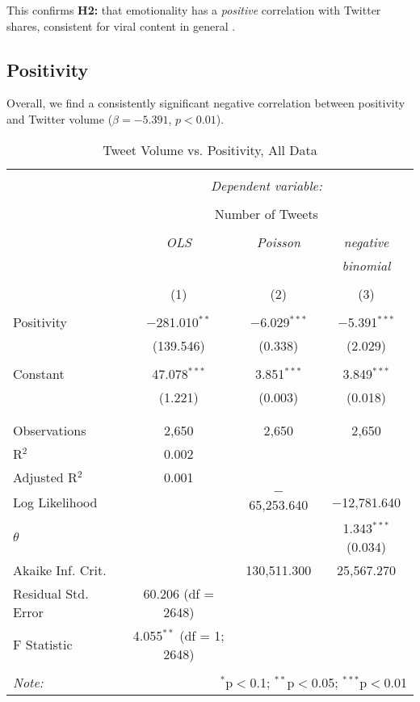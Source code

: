 This confirms \textbf{H2:} that emotionality has a \emph{positive} correlation with Twitter shares, consistent for viral content in general \cite{berger2012makes}.
\newpage

 
\subsection{Positivity}
Overall, we find a consistently significant negative correlation between positivity and Twitter volume ($\beta=−5.391$, $p<0.01$). 
 
\begin{table}[!htbp] \centering 
  \caption{Tweet Volume vs. Positivity, All Data} 
  \label{} 
    \begin{tabular}{@{\extracolsep{5pt}}lccc} 
    \\[-1.8ex]\hline 
    \hline \\[-1.8ex] 
     & \multicolumn{3}{c}{\textit{Dependent variable:}} \\ 
    \cline{2-4} 
    \\[-1.8ex] & \multicolumn{3}{c}{Number of Tweets} \\ 
    \\[-1.8ex] & \textit{OLS} & \textit{Poisson} & \textit{negative} \\ 
     & \textit{} & \textit{} & \textit{binomial} \\ 
    \\[-1.8ex] & (1) & (2) & (3)\\ 
    \hline \\[-1.8ex] 
     Positivity & $-$281.010$^{**}$ & $-$6.029$^{***}$ & $-$5.391$^{***}$ \\ 
      & (139.546) & (0.338) & (2.029) \\ 
      & & & \\ 
     Constant & 47.078$^{***}$ & 3.851$^{***}$ & 3.849$^{***}$ \\ 
      & (1.221) & (0.003) & (0.018) \\ 
      & & & \\ 
    \hline \\[-1.8ex] 
    Observations & 2,650 & 2,650 & 2,650 \\ 
    R$^{2}$ & 0.002 &  &  \\ 
    Adjusted R$^{2}$ & 0.001 &  &  \\ 
    Log Likelihood &  & $-$65,253.640 & $-$12,781.640 \\ 
    $\theta$ &  &  & 1.343$^{***}$  (0.034) \\ 
    Akaike Inf. Crit. &  & 130,511.300 & 25,567.270 \\ 
    Residual Std. Error & 60.206 (df = 2648) &  &  \\ 
    F Statistic & 4.055$^{**}$ (df = 1; 2648) &  &  \\ 
    \hline 
    \hline \\[-1.8ex] 
    \textit{Note:}  & \multicolumn{3}{r}{$^{*}$p$<$0.1; $^{**}$p$<$0.05; $^{***}$p$<$0.01} \\ 
    \end{tabular} 
\end{table} 

